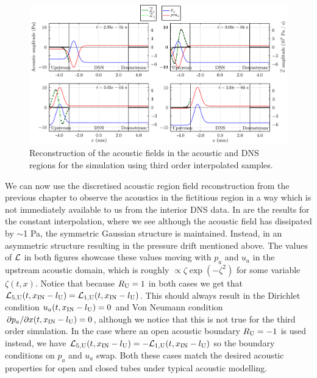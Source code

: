 \begin{figure}[t]
\centering
\includegraphics[scale=0.35]{assets/graphs/ac_frames.pdf}
\caption{Reconstruction of the acoustic fields in the acoustic and DNS regions for the simulation using third order interpolated samples.}
\label{fig:ac-reconstruct_order3}
\end{figure}

We can now use the discretised acoustic region field reconstruction from the previous chapter to observe the acoustics in the fictitious region in a way which is not immediately available to us from the interior DNS data. In  are the results for the constant interpolation, where we see although the acoustic field has dissipated by $\sim$1 Pa, the symmetric Gaussian structure is maintained. Instead, in  an asymmetric structure resulting in the pressure drift mentioned above. The values of $\cl{L}$ in both figures showcase these values moving with $p_a$ and $u_a$ in the upstream acoustic domain, which is roughly $\propto ζ \exp(-ζ^2)$ for some variable $ζ(t, x)$. Notice that because $R_{\rm{U}} = 1$ in both cases we get that $\cl{L}_{5, \rm{U}}(t, x_{\rm{IN}} - l_{\rm{U}}) = \cl{L}_{1, \rm{U}}(t, x_{\rm{IN}} - l_{\rm{U}})$. This should always result in the Dirichlet condition $u_a(t, x_{\rm{IN}} - l_{\rm{U}}) = 0$ and Von Neumann condition $\partial p_a / \partial x(t, x_{\rm{IN}} - l_{\rm{U}}) = 0$, although we notice that this is not true for the third order simulation. In the case where an open acoustic boundary $R_{\rm{U}} = -1$ is used instead, we have $\cl{L}_{5, \rm{U}}(t, x_{\rm{IN}} - l_{\rm{U}}) = -\cl{L}_{1, \rm{U}}(t, x_{\rm{IN}} - l_{\rm{U}})$ so the boundary conditions on $p_a$ and $u_a$ swap. Both these cases match the desired acoustic properties for open and closed tubes under typical acoustic modelling.




